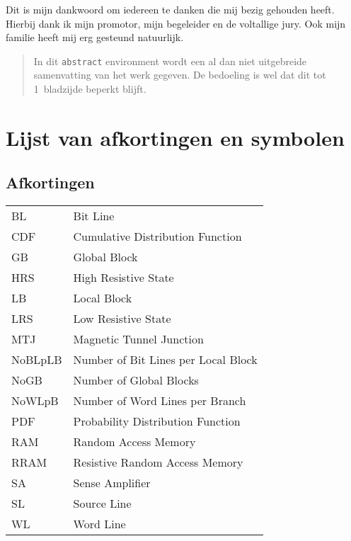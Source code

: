 \documentclass[master=elt,masteroption=eg]{kulemt}
\begin{document}
\begin{preface}
  Dit is mijn dankwoord om iedereen te danken die mij bezig gehouden heeft.
  Hierbij dank ik mijn promotor, mijn begeleider en de voltallige jury.
  Ook mijn familie heeft mij erg gesteund natuurlijk.
\end{preface}

\tableofcontents*

\begin{abstract}
  In dit \texttt{abstract} environment wordt een al dan niet uitgebreide
  samenvatting van het werk gegeven. De bedoeling is wel dat dit tot
  1~bladzijde beperkt blijft.

  \lipsum[1]
\end{abstract}

\listoffiguresandtables
\chapter{Lijst van afkortingen en symbolen}
\section*{Afkortingen}

\begin{flushleft}
  \renewcommand{\arraystretch}{1.1}
  \begin{tabularx}{\textwidth}{@{}p{18mm}X@{}}
    BL & Bit Line \\
    CDF & Cumulative Distribution Function \\
    GB & Global Block \\
    HRS & High Resistive State \\
    LB & Local Block \\
    LRS & Low Resistive State \\
    MTJ & Magnetic Tunnel Junction \\
    NoBLpLB & Number of Bit Lines per Local Block \\
    NoGB & Number of Global Blocks \\
    NoWLpB & Number of Word Lines per Branch \\
    PDF & Probability Distribution Function \\
    RAM & Random Access Memory \\
    RRAM & Resistive Random Access Memory \\
    SA & Sense Amplifier \\
    SL & Source Line \\
    WL & Word Line \\
  \end{tabularx}
\end{flushleft}
\end{document}
